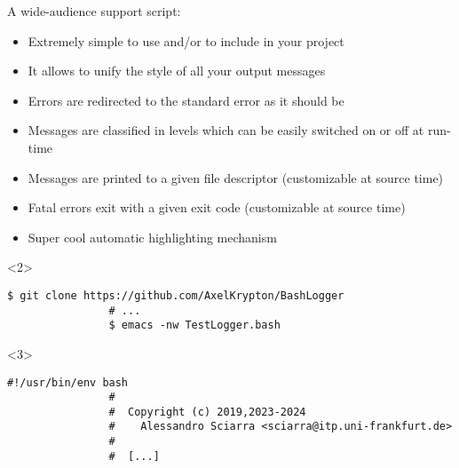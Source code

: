 \begin{frame}[fragile]{A wide-audience support script: }
    \vspace{-2mm}
    \begin{overlayarea}{\textwidth}{0.8\textheight}
        \begin{itemize}[<only@1-2>]
            \setlength{\itemsep}{4pt}
            \item Extremely simple to use and/or to include in your project
            \item It allows to unify the style of all your output messages
            \item Errors are redirected to the standard error as it should be
            \item Messages are classified in levels which can be easily switched on or off at run-time
            \item Messages are printed to a given file descriptor (customizable at source time)\\
            \item Fatal errors exit with a given exit code (customizable at source time)\\
            \item \alert{Super cool automatic highlighting mechanism}
        \end{itemize}
        \begin{onlyenv}<2>
            \begin{lstlisting}[style=myBash, aboveskip=3mm, numbers=none]
                $ git clone https://github.com/AxelKrypton/BashLogger
                # ...
                $ emacs -nw TestLogger.bash
            \end{lstlisting}
        \end{onlyenv}
        \begin{onlyenv}<3>
            \begin{lstlisting}[style=myBash, aboveskip=0mm, numbers=none, style=smaller, xleftmargin=-1mm, xrightmargin=-1mm]
                #!/usr/bin/env bash
                #
                #  Copyright (c) 2019,2023-2024
                #    Alessandro Sciarra <sciarra@itp.uni-frankfurt.de>
                #
                #  [...]


\end{lstlisting}
\end{onlyenv}
\end{overlayarea}
\end{frame}

